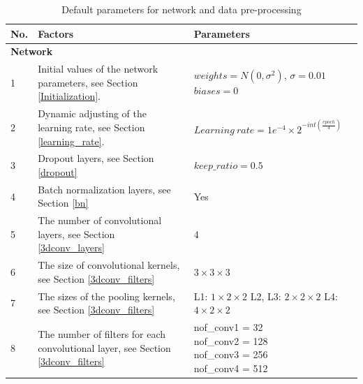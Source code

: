   \begin{table}
  	\caption{Default parameters for network and data pre-processing}
  	\begin{center}
  		\begin{tabular}{| m{0.6cm} | m{7cm} | m{6cm} |}
  			\hline
  			\textbf{No.} & \textbf{Factors} & \textbf{Parameters}  \\ \hline \hline
  			\multicolumn{3}{|l|}{\textbf{Network}}  \\ \hline
  			
  			1 & Initial values of the network parameters, see Section \ref{Initialization}. & \tabincell{l} 
  						{\(weights = N(0,\sigma^2)\), \(\sigma = 0.01\) \\ 
  						 \(biases = 0 \)} \\ \hline
  			
  			2 & Dynamic adjusting of the learning rate, see Section \ref{learning_rate}. & \(Learning\ rate = 1e^{-4} \times 2^{-int(\frac{epoch}{4})} \)	\\ \hline
  			
  			3 & Dropout layers, see Section \ref{dropout} & \(keep\_ratio = 0.5\)	\\ \hline
  			
  			4 & Batch normalization layers, see Section \ref{bn} &  Yes  \\ \hline
  			
  			5 & The number of convolutional layers, see Section \ref{3dconv_layers} & 4\\ \hline
  			
  			6 & The size of convolutional kernels, see Section \ref{3dconv_filters} & \(3 \times 3 \times 3\) \\ \hline
  			
  			7 & The sizes of the pooling kernels, see Section \ref{3dconv_filters} & \tabincell{l}
  			                                       {L1: \(1 \times 2 \times 2 \) \\ 
  			                                       	L2, L3: \(2 \times 2 \times 2 \) \\
  				                                    L4: \(4 \times 2 \times 2 \)}   \\ \hline
  			                                    
  			8 &  The number of filters for each convolutional layer, see Section \ref{3dconv_filters} &  \tabincell{l}
  														{nof\_conv1 = 32 \\ 
  														nof\_conv2 = 128 \\
  														nof\_conv3 = 256 \\
  														nof\_conv4 = 512}   \\ \hline
  													

\end{tabular}
\end{center}
\end{table}
